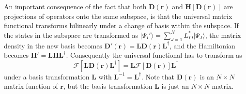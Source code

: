 \documentclass[journal=jpclcd,manuscript=letter]{achemso}
\DeclareMathOperator{\tr}{tr}
\newcommand\m[1]{\mathbf{#1}}
\renewcommand\vec[1]{\mathbf{#1}}
\begin{document}

An important consequence of the fact that both $\m{D}(\vec{r})$ and $\m{H}[\m{D}(\vec{r})]$
are projections of operators onto the same subspace, is
that the universal matrix functional transforms bilinearly under a change of basis within the subspace. \cite[(3)]{Lu2022JPCL}
If the states in the subspace are transformed as $\vert \Psi_I' \rangle = \sum_{J=1}^N L^*_{IJ} \vert \Psi_J \rangle$,
the matrix density in the new basis becomes $\m{D}'(\vec{r}) = \m{L} \m{D}(\vec{r}) \m{L}^{\dagger}$, and the Hamiltonian becomes 
$\m{H}' = \m{L} \m{H} \m{L}^{\dagger}$.
Consequently the universal functional has to transform as \cite{Lu2022JPCL}
\begin{equation}
 \m{\mathcal{F}}[\m{L} \m{D}(\vec{r}) \m{L}^{\dagger}] = \m{L} \m{\mathcal{F}}[\m{D}(\vec{r})] \m{L}^{\dagger} \label{eqn:F_basis_transformation}
\end{equation}
under a basis transformation $\m{L}$ with $\m{L}^{-1} = \m{L}^{\dagger}$. Note that $\m{D}(\vec{r})$ is an $N \times N$ matrix function of $\vec{r}$,
but the basis transformation $\m{L}$ is just an $N \times N$ matrix.
\end{document}
